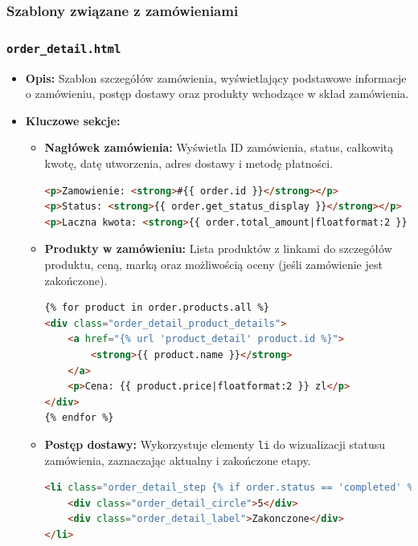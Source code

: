 \documentclass[12pt,a4paper,oneside]{article}
\theoremstyle{definition}
\numberwithin{equation}{section}
\begin{document}
\subsubsection{Szablony związane z zamówieniami}
\label{sec:order_detail_template}
\subsubsection*{\texttt{order\_detail.html}}
\begin{itemize}
    \item \textbf{Opis:} 
    Szablon szczegółów zamówienia, wyświetlający podstawowe informacje o zamówieniu, postęp dostawy oraz produkty wchodzące w skład zamówienia.  
    \item \textbf{Kluczowe sekcje:}
    \begin{itemize}
        \item \textbf{Nagłówek zamówienia:} 
        Wyświetla ID zamówienia, status, całkowitą kwotę, datę utworzenia, adres dostawy i metodę płatności.
        \begin{lstlisting}[language=HTML]
<p>Zamowienie: <strong>#{{ order.id }}</strong></p>
<p>Status: <strong>{{ order.get_status_display }}</strong></p>
<p>Laczna kwota: <strong>{{ order.total_amount|floatformat:2 }} zl</strong></p>
        \end{lstlisting}
        \item \textbf{Produkty w zamówieniu:} 
        Lista produktów z linkami do szczegółów produktu, ceną, marką oraz możliwością oceny (jeśli zamówienie jest zakończone).
        \begin{lstlisting}[language=HTML]
{% for product in order.products.all %}
<div class="order_detail_product_details">
    <a href="{% url 'product_detail' product.id %}">
        <strong>{{ product.name }}</strong>
    </a>
    <p>Cena: {{ product.price|floatformat:2 }} zl</p>
</div>
{% endfor %}
        \end{lstlisting}
        \item \textbf{Postęp dostawy:}
        Wykorzystuje elementy \texttt{li} do wizualizacji statusu zamówienia, zaznaczając aktualny i zakończone etapy.
        \begin{lstlisting}[language=HTML]
<li class="order_detail_step {% if order.status == 'completed' %}completed{% endif %}">
    <div class="order_detail_circle">5</div>
    <div class="order_detail_label">Zakonczone</div>
</li>
        \end{lstlisting}
    \end{itemize}
\end{itemize}
\end{document}
